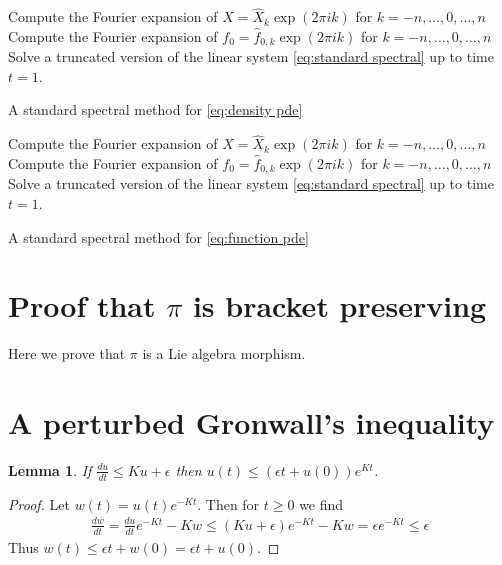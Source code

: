 \documentclass[12pt]{amsart}
\newtheorem{lem}[thm]{Lemma}
\begin{document}
\begin{algorithm}[h]
	Compute the Fourier expansion of $X = \hat{X}_{k} \exp( 2\pi i k)$ for $k=-n,\dots,0,\dots,n$\;
	Compute the Fourier expansion of $f_{0} = \hat{f}_{0,k} \exp( 2\pi i k)$ for $k=-n,\dots,0,\dots,n$\;
	Solve a truncated version of the linear system \eqref{eq:standard spectral} up to time $t=1$.\;
	\caption{A standard spectral method for \eqref{eq:density pde}}\label{alg:spectral density}
\end{algorithm}

\begin{algorithm}[h]
	Compute the Fourier expansion of $X = \hat{X}_{k} \exp( 2\pi i k)$ for $k=-n,\dots,0,\dots,n$\;
	Compute the Fourier expansion of $f_{0} = \hat{f}_{0,k} \exp( 2\pi i k)$ for $k=-n,\dots,0,\dots,n$\;
	Solve a truncated version of the linear system \eqref{eq:standard spectral} up to time $t=1$.\;
	\caption{A standard spectral method for \eqref{eq:function pde}}\label{alg:spectral function}
\end{algorithm}

\section{Proof that $\pi$ is bracket preserving} \label{app:Lie}
Here we prove that $\pi$ is a Lie algebra morphism.

\section{A perturbed Gronwall's inequality}
\begin{lem} \label{lem:Gronwall}
If $\frac{du}{dt} \leq Ku + \epsilon$ then $u(t) \leq (\epsilon t + u(0) ) e^{Kt}$.
\end{lem}
\begin{proof}
	Let $w (t)= u (t) e^{-Kt}$.  Then for $t \geq 0$ we find
	\begin{align}
		\frac{dw}{dt} = \frac{du}{dt} e^{-Kt} - K w \leq (Ku+\epsilon) e^{-Kt} - Kw = \epsilon e^{-Kt} \leq \epsilon
	\end{align}
	Thus $w(t) \leq \epsilon t + w(0) = \epsilon t + u(0)$.
\end{proof}



\end{document}
